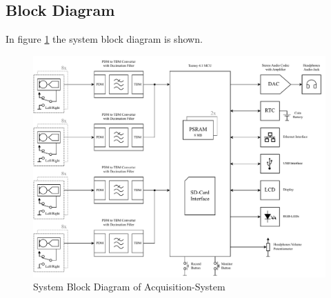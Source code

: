 \subsection{Block Diagram}
In figure \ref{fig:acquisition_system_design_block_diagram} the system block diagram is shown.
\vspace{-0.2cm}
\begin{figure}[h]
	\centering
	\includegraphics[width=1.0\textwidth, trim={0 0 0 0.1cm}]{images/4_design_acquisition_system/acquisition_system_design_block_diagram.pdf}
	\caption{System Block Diagram of Acquisition-System}
	\label{fig:acquisition_system_design_block_diagram}
\end{figure}
\vspace{-0.4cm}

